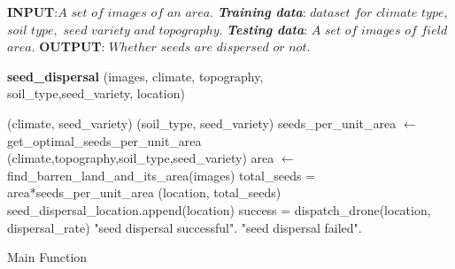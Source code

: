 \documentclass[conference]{IEEEtran}
\begin{document}
\begin{algorithm} [ht]
\begin{scriptsize}
\begin{algorithmic}[1]
\STATE \textbf{INPUT}:$A$ $set$ $of$ $images$ $of$ $an$ $area$.
\STATE \textit{\textbf{Training data}}: $dataset$ $for$ $climate$ $type,$ $soil$ $type,$ $seed$ $variety$ $and$ $topography.$
\STATE \textit{\textbf{Testing data}}: $A$ $set$ $of$ $images$ $of$ $field$ $area.$
\STATE \textbf{OUTPUT}: $Whether$ $seeds$ $are$ $dispersed$ $or$ $not.$ 
\medbreak

\STATE \textbf{seed\_dispersal}
(images, climate, topography,\\soil\_type,seed\_variety, location) 
    \begin{ALC@g}
    (climate, seed\_variety)
    (soil\_type, seed\_variety)
    \STATE  seeds\_per\_unit\_area $\gets$ {get\_optimal\_seeds\_per\_unit\_area}\\(climate,topography,soil\_type,seed\_variety)
    \STATE  area $\gets$ {find\_barren\_land\_and\_its\_area}(images)
    \STATE  total\_seeds = area*seeds\_per\_unit\_area
    (location, total\_seeds)
    \STATE  seed\_dispersal\_location.append(location)
    \STATE  success = {dispatch\_drone}(location, dispersal\_rate)
        \RETURN   "seed dispersal successful".
    \ELSE
        \RETURN   "seed dispersal failed".
    \ENDIF
    \end{ALC@g}
    
\end{algorithmic}
\caption{Main Function}
\end{scriptsize}
\label{algo:resuti}
\end{algorithm}
\end{document}
